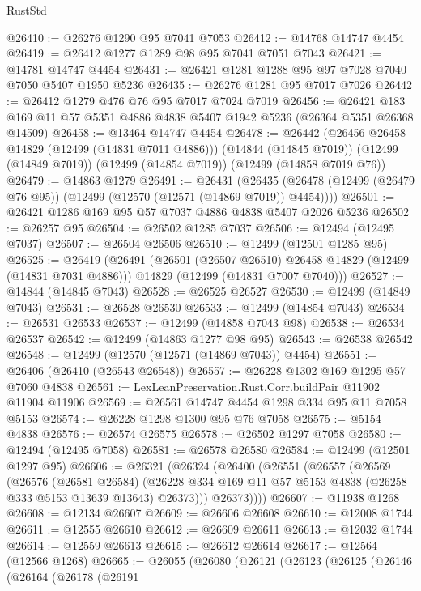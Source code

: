 \begin{lexlean}{RustStd}
\begin{coremodule}
{\begin{coremodule}
{{{{{{{{{{{{{{{{{{{{{{{{{{{{{{{{{{{{{{{{{{{{{{{{{{{{{{{{{{{{{{{{{{{{{{{{{{{{{{{{@26410 := @26276 @1290 @95 @7041 @7053
@26412 := @14768 @14747 @4454
@26419 := @26412 @1277 @1289 @98 @95 @7041 @7051 @7043
@26421 := @14781 @14747 @4454
@26431 := @26421 @1281 @1288 @95 @97 @7028 @7040 @7050 @5407 @1950 @5236
@26435 := @26276 @1281 @95 @7017 @7026
@26442 := @26412 @1279 @476 @76 @95 @7017 @7024 @7019
@26456 := @26421 @183 @169 @11 @57 @5351 @4886 @4838 @5407 @1942 @5236 (@26364 @5351 @26368 @14509)
@26458 := @13464 @14747 @4454
@26478 := @26442
    (@26456 @26458 @14829 (@12499 (@14831 @7011 @4886)))
    (@14844 (@14845 @7019))
    (@12499 (@14849 @7019))
    (@12499 (@14854 @7019))
    (@12499 (@14858 @7019 @76))
@26479 := @14863 @1279
@26491 := @26431
    (@26435 (@26478 (@12499 (@26479 @76 @95)) (@12499 (@12570 (@12571 (@14869 @7019)) @4454))))
@26501 := @26421 @1286 @169 @95 @57 @7037 @4886 @4838 @5407 @2026 @5236
@26502 := @26257 @95
@26504 := @26502 @1285 @7037
@26506 := @12494 (@12495 @7037)
@26507 := @26504 @26506
@26510 := @12499 (@12501 @1285 @95)
@26525 := @26419
    (@26491
      (@26501 (@26507 @26510) @26458 @14829 (@12499 (@14831 @7031 @4886)))
      @14829
      (@12499 (@14831 @7007 @7040)))
@26527 := @14844 (@14845 @7043)
@26528 := @26525 @26527
@26530 := @12499 (@14849 @7043)
@26531 := @26528 @26530
@26533 := @12499 (@14854 @7043)
@26534 := @26531 @26533
@26537 := @12499 (@14858 @7043 @98)
@26538 := @26534 @26537
@26542 := @12499 (@14863 @1277 @98 @95)
@26543 := @26538 @26542
@26548 := @12499 (@12570 (@12571 (@14869 @7043)) @4454)
@26551 := @26406 (@26410 (@26543 @26548))
@26557 := @26228 @1302 @169 @1295 @57 @7060 @4838
@26561 := LexLeanPreservation.Rust.Corr.buildPair @11902 @11904 @11906
@26569 := @26561 @14747 @4454 @1298 @334 @95 @11 @7058 @5153
@26574 := @26228 @1298 @1300 @95 @76 @7058
@26575 := @5154 @4838
@26576 := @26574 @26575
@26578 := @26502 @1297 @7058
@26580 := @12494 (@12495 @7058)
@26581 := @26578 @26580
@26584 := @12499 (@12501 @1297 @95)
@26606 := @26321
    (@26324
      (@26400
        (@26551
          (@26557
            (@26569
              (@26576
                (@26581 @26584)
                (@26228 @334 @169 @11 @57 @5153 @4838 (@26258 @333 @5153 @13639 @13643) @26373)))
            @26373))))
@26607 := @11938 @1268
@26608 := @12134 @26607
@26609 := @26606 @26608
@26610 := @12008 @1744
@26611 := @12555 @26610
@26612 := @26609 @26611
@26613 := @12032 @1744
@26614 := @12559 @26613
@26615 := @26612 @26614
@26617 := @12564 (@12566 @1268)
@26665 := @26055
    (@26080
      (@26121
        (@26123
          (@26125
            (@26146
              (@26164
                (@26178
                  (@26191
}}}}}}}}}}}}}}}}}}}}}}}}}}}}}}}}}}}}}}}}}}}}}}}}}}}}}}}}}}}}}}}}}}}}}}}}}}}}}}}}
\end{coremodule}}
\end{coremodule}
\end{lexlean}
